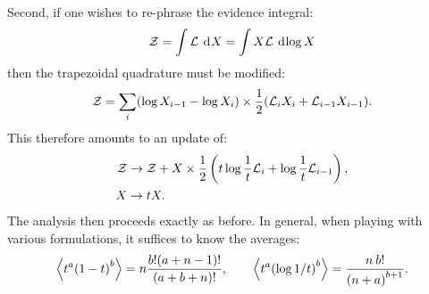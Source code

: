Second, if one wishes to re-phrase the evidence integral:
\begin{equation}
  \mathcal{Z} = \int \mathcal{L} \: \operatorname{d}^{}\!{X} = \int X\mathcal{L} \: \operatorname{d}^{}\!{\log X}
\end{equation}
then the trapezoidal quadrature must be modified:
\begin{equation}
  \mathcal{Z} = \sum\limits_{i} (\log X_{i-1}-\log X_{i}) \times \frac{1}{2}(\mathcal{L}_i X_i+\mathcal{L}_{i-1} X_{i-1}).
\end{equation}
This therefore amounts to an update of:
\begin{align}
  \mathcal{Z} &\to \mathcal{Z} + X \times \frac{1}{2}\left(t\log\frac{1}{t}\mathcal{L}_i + \log\frac{1}{t}\mathcal{L}_{i-1} \right),
  \\
  X &\to t X.
\end{align}
The analysis then proceeds exactly as before. 
In general, when playing with various formulations, it suffices to know the averages:
\begin{equation}
  {\left\langle{t^a{(1-t)}^b}\right\rangle} = n\frac{b!(a+n-1)!}{(a+b+n)!},\qquad
  {\left\langle{t^a{\left( \log1/t \right)}^b}\right\rangle}
  = 
  \frac{n\: b!}{{(n+a)}^{b+1}}.
\end{equation}

